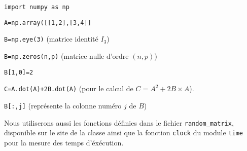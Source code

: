 \medskip 


\texttt{import numpy as np}

\texttt{A=np.array([[1,2],[3,4]]}

\texttt{B=np.eye(3)}     (matrice identité $I_3$)

\texttt{B=np.zeros(n,p)}     (matrice nulle d'ordre $(n,p)$)

\texttt{B[1,0]=2}

\texttt{C=A.dot(A)+2B.dot(A)}   (pour le calcul de $C=A^2+2B\times A$).

\texttt{B[:,j]}  (représente la colonne numéro $j$ de $B$)

\eject 

Nous utiliserons aussi les fonctions définies dans le fichier \texttt{random\_matrix}, disponible sur le site de la classe ainsi que la fonction \texttt{clock} du module \texttt{time} pour la mesure des temps d'éxécution.

\medskip

